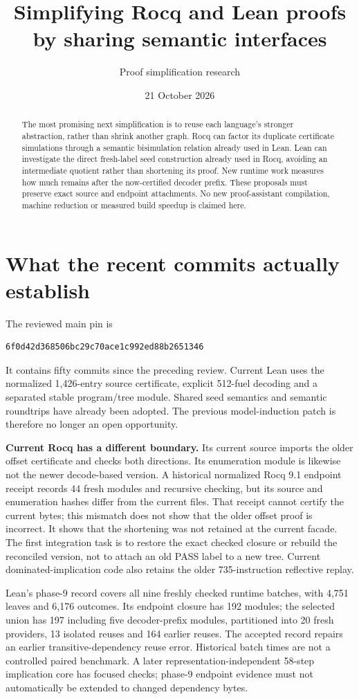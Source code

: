 \documentclass[11pt]{article}
\title{Simplifying Rocq and Lean proofs by sharing semantic interfaces}
\author{Proof simplification research}\date{21 October 2026}
\begin{document}
\maketitle
\begin{abstract}
The most promising next simplification is to reuse each language's stronger abstraction, rather than shrink another graph. Rocq can factor its duplicate certificate simulations through a semantic bisimulation relation already used in Lean. Lean can investigate the direct fresh-label seed construction already used in Rocq, avoiding an intermediate quotient rather than shortening its proof. New runtime work measures how much remains after the now-certified decoder prefix. These proposals must preserve exact source and endpoint attachments. No new proof-assistant compilation, machine reduction or measured build speedup is claimed here.
\end{abstract}
\section{What the recent commits actually establish}
The reviewed main pin is
\begin{verbatim}
6f0d42d368506bc29c70ace1c992ed88b2651346
\end{verbatim}
It contains fifty commits since the preceding review. Current Lean uses the normalized 1,426-entry source certificate, explicit 512-fuel decoding and a separated stable program/tree module. Shared seed semantics and semantic roundtrips have already been adopted. The previous model-induction patch is therefore no longer an open opportunity.

\textbf{Current Rocq has a different boundary.} Its current source imports the older offset certificate and checks both directions. Its enumeration module is likewise not the newer decode-based version. A historical normalized Rocq 9.1 endpoint receipt records 44 fresh modules and recursive checking, but its source and enumeration hashes differ from the current files. That receipt cannot certify the current bytes; this mismatch does not show that the older offset proof is incorrect. It shows that the shortening was not retained at the current facade. The first integration task is to restore the exact checked closure or rebuild the reconciled version, not to attach an old PASS label to a new tree. Current dominated-implication code also retains the older 735-instruction reflective replay.

Lean's phase-9 record covers all nine freshly checked runtime batches, with 4,751 leaves and 6,176 outcomes. Its endpoint closure has 192 modules; the selected union has 197 including five decoder-prefix modules, partitioned into 20 fresh providers, 13 isolated reuses and 164 earlier reuses. The accepted record repairs an earlier transitive-dependency reuse error. Historical batch times are not a controlled paired benchmark. A later representation-independent 58-step implication core has focused checks; phase-9 endpoint evidence must not automatically be extended to changed dependency bytes.
\end{document}
